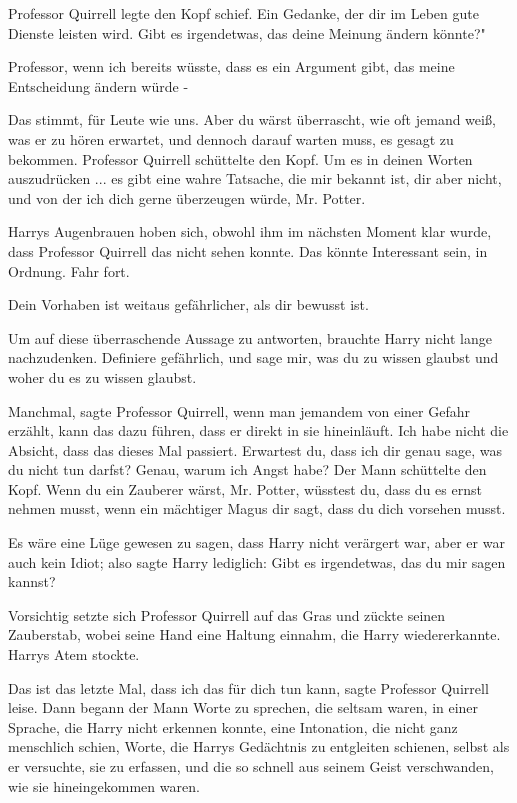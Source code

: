 Professor Quirrell legte den Kopf schief. \glqq{}Ein Gedanke, der dir im Leben
gute Dienste leisten wird. Gibt es irgendetwas, das deine Meinung ändern
könnte?"

\glqq{}Professor, wenn ich bereits wüsste, dass es ein Argument gibt, das meine
Entscheidung ändern würde -\grqq{}

\glqq{}Das stimmt, für Leute wie uns. Aber du wärst überrascht, wie oft jemand
weiß, was er zu hören erwartet, und dennoch darauf warten muss, es gesagt zu
bekommen.\grqq{} Professor Quirrell schüttelte den Kopf. \glqq{}Um es in deinen
Worten auszudrücken ... es gibt eine wahre Tatsache, die mir bekannt ist, dir
aber nicht, und von der ich dich gerne überzeugen würde, Mr. Potter.\grqq{}

Harrys Augenbrauen hoben sich, obwohl ihm im nächsten Moment klar wurde, dass
Professor Quirrell das nicht sehen konnte. \glqq{}Das könnte Interessant sein, in
Ordnung. Fahr fort.\grqq{}

\glqq{}Dein Vorhaben ist weitaus gefährlicher, als dir bewusst ist.\grqq{}

Um auf diese überraschende Aussage zu antworten, brauchte Harry nicht lange
nachzudenken. \glqq{}Definiere gefährlich, und sage mir, was du zu wissen glaubst
und woher du es zu wissen glaubst.\grqq{}

\glqq{}Manchmal\grqq{}, sagte Professor Quirrell, \glqq{}wenn man jemandem von
einer Gefahr erzählt, kann das dazu führen, dass er direkt in sie hineinläuft.
Ich habe nicht die Absicht, dass das dieses Mal passiert. Erwartest du, dass ich
dir genau sage, was du nicht tun darfst? Genau, warum ich Angst habe?\grqq{} Der
Mann schüttelte den Kopf. \glqq{}Wenn du ein Zauberer wärst, Mr. Potter, wüsstest
du, dass du es ernst nehmen musst, wenn ein mächtiger Magus dir sagt, dass du
dich vorsehen musst.\grqq{}

Es wäre eine Lüge gewesen zu sagen, dass Harry nicht verärgert war, aber er war
auch kein Idiot; also sagte Harry lediglich: \glqq{}Gibt es irgendetwas, das du
mir sagen kannst?\grqq{}

Vorsichtig setzte sich Professor Quirrell auf das Gras und zückte seinen
Zauberstab, wobei seine Hand eine Haltung einnahm, die Harry wiedererkannte.
Harrys Atem stockte.

\glqq{}Das ist das letzte Mal, dass ich das für dich tun kann\grqq{}, sagte
Professor Quirrell leise. Dann begann der Mann Worte zu sprechen, die seltsam
waren, in einer Sprache, die Harry nicht erkennen konnte, eine Intonation, die
nicht ganz menschlich schien, Worte, die Harrys Gedächtnis zu entgleiten
schienen, selbst als er versuchte, sie zu erfassen, und die so schnell aus
seinem Geist verschwanden, wie sie hineingekommen waren.

